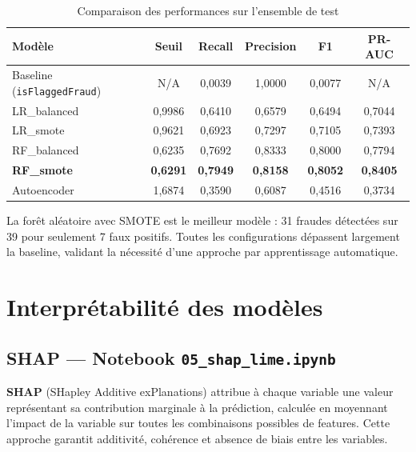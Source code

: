 \documentclass[12pt,a4paper,twoside]{report}
\begin{document}
\begin{table}[H]
\centering
\caption{Comparaison des performances sur l'ensemble de test}
\label{tab:results_comparison}
\begin{tabular}{lccccc}
\toprule
\textbf{Modèle}             & \textbf{Seuil} & \textbf{Recall} & \textbf{Precision} & \textbf{F1} & \textbf{PR-AUC} \\
\midrule
Baseline (\texttt{isFlaggedFraud}) & N/A    & 0,0039 & 1,0000 & 0,0077 & N/A \\
LR\_balanced                & 0,9986         & 0,6410 & 0,6579 & 0,6494 & 0,7044 \\
LR\_smote                   & 0,9621         & 0,6923 & 0,7297 & 0,7105 & 0,7393 \\
RF\_balanced                & 0,6235         & 0,7692 & 0,8333 & 0,8000 & 0,7794 \\
\textbf{RF\_smote}          & \textbf{0,6291}& \textbf{0,7949}& \textbf{0,8158}& \textbf{0,8052}& \textbf{0,8405} \\
Autoencoder                 & 1,6874         & 0,3590 & 0,6087 & 0,4516 & 0,3734 \\
\bottomrule
\end{tabular}
\end{table}

La forêt aléatoire avec SMOTE est le meilleur modèle : 31 fraudes détectées sur 39 pour seulement 7 faux positifs. Toutes les configurations dépassent largement la baseline, validant la nécessité d'une approche par apprentissage automatique.

\section{Interprétabilité des modèles}

\subsection{SHAP --- Notebook \texttt{05\_shap\_lime.ipynb}}

\begin{definitionbox}
\textbf{SHAP} (SHapley Additive exPlanations) attribue à chaque variable une valeur représentant sa contribution marginale à la prédiction, calculée en moyennant l'impact de la variable sur toutes les combinaisons possibles de features. Cette approche garantit additivité, cohérence et absence de biais entre les variables.
\end{definitionbox}
\end{document}
